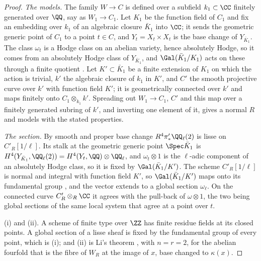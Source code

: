 \begin{proof}
\emph{The models.} The family $W\to C$ is defined over a subfield
$k_{1}\subset\CC$ finitely generated over $\QQ$, say as $W_{1}\to C_{1}$. Let
$K_{1}$ be the function field of $C_{1}$ and fix an embedding over $k_{1}$ of
an algebraic closure $\bar{K}_{1}$ into $\CC$; it sends the geometric generic
point of $C_{1}$ to a point $t\in C$, and $Y_{t}=X_{t}\times X_{t}$ is the base
change of $Y_{\bar{K}_{1}}$. The class $\omega_{t}$ is a Hodge class on an
abelian variety, hence absolutely Hodge, so it comes from an absolutely Hodge
class of $Y_{\bar{K}_{1}}$, and $\Gal(\bar{K}_{1}/K_{1})$ acts on these
through a finite quotient \cite[Theorem~2.11 and Proposition~2.9]{Del82}. Let
$K'\subset\bar{K}_{1}$ be a finite extension of $K_{1}$ on which the action is
trivial, $k'$ the algebraic closure of $k_{1}$ in $K'$, and $C'$ the smooth
projective curve over $k'$ with function field $K'$; it is geometrically
connected over $k'$ and maps finitely onto $C_{1}\otimes_{k_{1}}k'$.
Spreading out $W_{1}\to C_{1}$, $C'$ and this map over a finitely generated
subring of $k'$, and inverting one element of it, gives a normal $R$ and
models with the stated properties.

\emph{The section.} By smooth and proper base change
$R^{4}\pi'_{*}\QQ_{\ell}(2)$ is lisse on $C'_{R}[1/\ell]$. Its stalk at the
geometric generic point $\Spec\bar{K}_{1}$ is $H^{4}(Y_{\bar{K}_{1}},
\QQ_{\ell}(2))=H^{4}(Y_{t},\QQ)\otimes\QQ_{\ell}$, and $\omega_{t}\otimes1$
is the $\ell$-adic component of an absolutely Hodge class, so it is fixed by
$\Gal(\bar{K}_{1}/K')$. The scheme $C'_{R}[1/\ell]$ is normal and integral
with function field $K'$, so $\Gal(\bar{K}_{1}/K')$ maps onto its fundamental
group \cite[Tag~0BQI]{Stacks}, and the vector extends to a global section
$\omega_{\ell}$. On the connected curve $C'_{R}\otimes_{R}\CC$ it agrees with
the pull-back of $\omega\otimes1$, the two being global sections of the same
local system that agree at a point over $t$.

(i) and (ii). A scheme of finite type over $\ZZ$ has finite residue fields at
its closed points. A global section of a lisse sheaf is fixed by the
fundamental group of every point, which is (i); and (ii) is Li's theorem
\cite[Theorem~1.1]{Li26}, with $n=r=2$, for the abelian fourfold that is the
fibre of $W_{R}$ at the image of $x$, base changed to $\kappa(x)$.


\end{proof}
